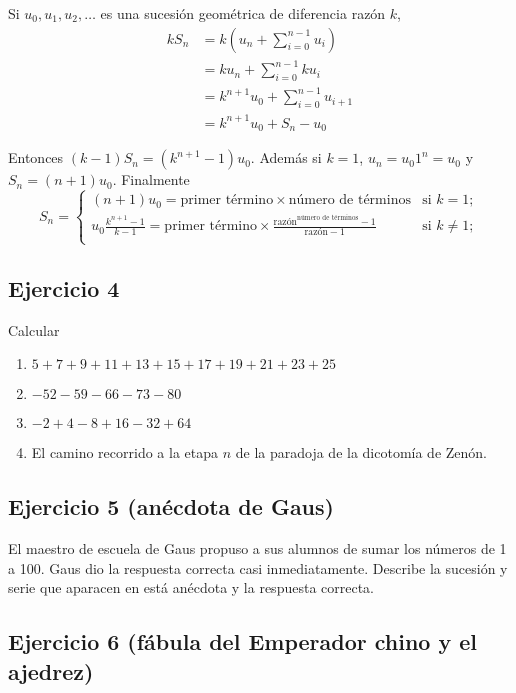 Si $u_0, u_1, u_2, \ldots$ es una sucesión geométrica de diferencia razón $k$,
$$
\begin{aligned}
k S_n &= k \left( u_n + \sum_{i=0}^{n-1} u_i \right)\\
      &= {k u_n} + \sum_{i=0}^{n-1} {k u_{i}} \\
      &= {k^{n+1} u_0} + \sum_{i=0}^{n-1} {u_{i+1}} \\
      &= k^{n+1} u_0 + S_n - u_0
\end{aligned}
$$

Entonces ${(k - 1)} S_n = {(k^{n+1} - 1)} u_0$. Además si $k=1$,
$u_n = u_0 1^n = u_0$ y $S_n = (n+1) u_0$. Finalmente
$$
S_n = 
\begin{cases}
{(n+1)} u_0 = \text{primer término} \times \text{número de términos}
& \text{si $k = 1$}; \\
u_0 \frac{k^{n+1} - 1}{k-1}
= \text{primer término} \times
\frac{\text{razón}^{\text{número de términos}} - 1}{\text{razón} - 1}
& \text{si $k \neq 1$}; \\
\end{cases}
$$

\subsection*{Ejercicio 4}

Calcular

\begin{enumerate}
\item $5 + 7 + 9 + 11 + 13 + 15 + 17 + 19 + 21 + 23 + 25$
\item $-52 - 59 - 66 -73 - 80$
\item $-2 + 4 - 8 + 16 - 32 + 64$
\item El camino recorrido a la etapa $n$ de la paradoja de la dicotomía de
  Zenón.
\end{enumerate}

\subsection*{Ejercicio 5 (anécdota de Gaus)}

El maestro de escuela de Gaus propuso a sus alumnos de sumar los números de 1
a 100. Gaus dio la respuesta correcta casi inmediatamente.
Describe la sucesión y serie que aparacen en está anécdota y la respuesta
correcta.

\subsection*{Ejercicio 6 (fábula del Emperador chino y el ajedrez)}

